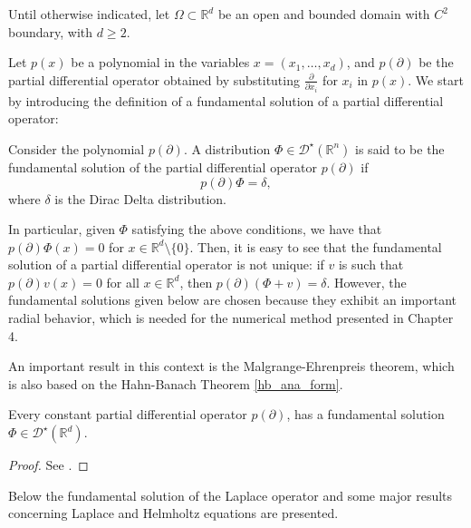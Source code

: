 \label{chap:problem_introduction}

Until otherwise indicated, let \(\Omega \subset \mathbb{R}^d\) be an open and bounded domain with \(C^2\) boundary, with $d \geq 2$.

Let \(p(x)\) be a polynomial in the variables \(x=(x_1,\dots,x_d)\), and \(p(\partial)\) be the partial differential operator obtained by substituting \(\frac{\partial}{\partial x_i}\) for \(x_i\) in \(p(x)\). We start by introducing the definition of a fundamental solution of a partial differential operator:

\begin{definition}
    Consider the polynomial \(p(\partial)\). A distribution \(\Phi \in \mathcal{D}^\star(\mathbb{R}^n)\) is said to be the fundamental solution of the partial differential operator \(p(\partial)\) if
    \[
        p(\partial) \Phi = \delta,
    \]
    where \(\delta\) is the Dirac Delta distribution.
\end{definition}

In particular, given \(\Phi\) satisfying the above conditions, we have that \(p(\partial)\Phi(x) = 0\) for \(x \in \mathbb{R}^d\setminus \{0\}\). Then, it is easy to see that the fundamental solution of a partial differential operator is not unique: if \(v\) is such that \(p(\partial) v(x) = 0\) for all \(x \in \mathbb{R}^d\), then \(p(\partial) (\Phi + v) = \delta\). However, the fundamental solutions given below are chosen because they exhibit an important radial behavior, which is needed for the numerical method presented in Chapter 4.

An important result in this context is the Malgrange-Ehrenpreis theorem, which is also based on the Hahn-Banach Theorem \ref{hb_ana_form}.

\begin{theorem}\label{malgrange-ehrenpreis}
    Every constant partial differential operator $p(\partial)$, has a fundamental solution $\Phi \in \mathcal{D}^\star(\mathbb{R}^d)$.
\end{theorem}
\begin{proof}
    See \cite{reed1975ii}.
\end{proof}
Below the fundamental solution of the Laplace operator and some major results concerning Laplace and Helmholtz equations are presented. 

